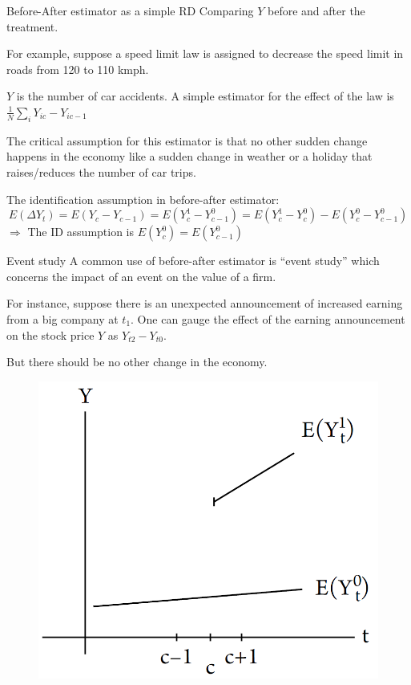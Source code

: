\documentclass[handout]{beamer}
\begin{document}
\begin{frame}{Before-After estimator as a simple RD}
	Comparing $Y$ before and after the treatment.\medskip
	
	For example, suppose a speed limit law is assigned to decrease the speed limit in roads from 120 to 110 kmph.\medskip
	
	$Y$ is the number of car accidents. A simple estimator for the effect of the law is $\frac{1}{N}\sum_i Y_{ic}-Y_{ic-1}$\medskip
	
	The critical assumption for this estimator is that no other sudden change happens in the economy like a sudden change in weather or a holiday that raises/reduces the number of car trips.\medskip
	
	The identification assumption in before-after estimator:
	\[E(\Delta Y_t)=E(Y_c-Y_{c-1})=E(Y^1_c-Y^0_{c-1}) = E(Y^1_c-Y^0_c)-E(Y^0_c-Y^0_{c-1})\]
	$\Rightarrow$ The ID assumption is $E(Y^0_c)=E(Y^0_{c-1})$
	
\end{frame}



\begin{frame}{Event study}
A common use of before-after estimator is ``event study'' which concerns the impact of an event on the value of a firm.\bigskip
 
For instance, suppose there is an unexpected announcement of increased earning from a big company at $t_1$. One can gauge the effect of the earning announcement on the stock price $Y$ as  $Y_{t2}-Y_{t0}$.\medskip

But there should be no other change in the economy.
\begin{figure}
	\centering
	\includegraphics[width=0.4\linewidth]{./Figures/BAestimator}
	\caption{}
	\label{fig:baestimator}
\end{figure}

\end{frame}
\end{document}
